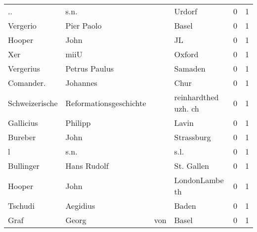 \begin{tabular}{llllrr}
                       .. &                               s.n. &             &                                      Urdorf &          0 &         1 \\
                 Vergerio &                         Pier Paolo &             &                                       Basel &          0 &         1 \\
                   Hooper &                               John &             &                                          JL &          0 &         1 \\
                      Xer &                               miiU &             &                                      Oxford &          0 &         1 \\
                Vergerius &                      Petrus Paulus &             &                                     Samaden &          0 &         1 \\
                Comander. &                           Johannes &             &                                        Chur &          0 &         1 \\
           Schweizerische &             Reformationsgeschichte &             &                        reinhardthed uzh. ch &          0 &         1 \\
                Gallicius &                            Philipp &             &                                       Lavin &          0 &         1 \\
                  Bureber &                               John &             &                                  Strassburg &          0 &         1 \\
                        l &                               s.n. &             &                                        s.l. &          0 &         1 \\
                Bullinger &                        Hans Rudolf &             &                                  St. Gallen &          0 &         1 \\
                   Hooper &                               John &             &                              LondonLambe th &          0 &         1 \\
                  Tschudi &                           Aegidius &             &                                       Baden &          0 &         1 \\
                     Graf &                              Georg &         von &                                       Basel &          0 &         1 \\

\end{tabular}
